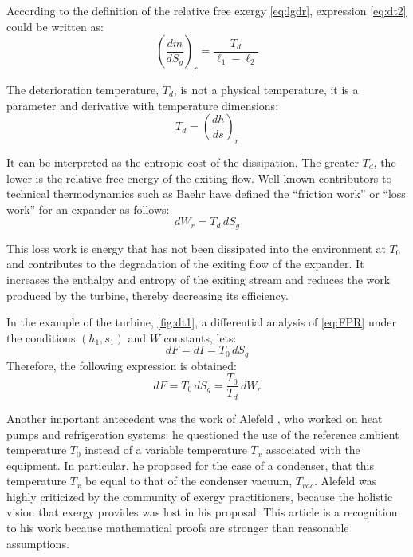 \documentclass[energies,article,submit,moreauthors,pdftex]{Definitions/mdpi}
\begin{document}
According to the definition of the relative free exergy \cref{eq:lgdr}, expression \eqref{eq:dt2} could be written as:
\begin{equation}
\left(\frac{dm}{dS_g}\right)_r = \frac{T_d}{\ell_1 - \ell_2}
\label{eq:dt2g}
\end{equation}

The deterioration temperature, $T_d$, is not a physical temperature, it is a parameter and derivative with temperature dimensions:
\begin{equation}
T_d=\left(\frac{dh}{ds}\right)_r
\end{equation}

It can be interpreted as the entropic cost of the dissipation. The greater $T_d$, the lower is the relative free energy of the exiting flow.
Well-known contributors to technical thermodynamics such as Baehr \cite{Baehr2005} have defined the “friction work” or “loss work” for an expander as follows:
\begin{equation}
	dW_r=T_d\,dS_g
\end{equation}

This loss work is energy that has not been dissipated into the environment at $T_0$ and contributes to the degradation of the exiting flow of the expander. It increases the enthalpy and entropy of the exiting stream and reduces the work produced by the turbine, thereby decreasing its efficiency.

In the example of the turbine, \cref{fig:dt1}, a differential analysis of \cref{eq:FPR} under the conditions $(h_1,s_1)$ and $W$ constants, lets:
\begin{equation}
dF=dI=T_0\,dS_g
\label{eq:dfi}
\end{equation}
Therefore, the following expression is obtained:
\begin{equation}
dF=T_0\,dS_g=\frac{T_0}{T_d}\,dW_r
\end{equation}

Another important antecedent was the work of Alefeld \cite{Alefeld1988}, who worked on heat pumps and refrigeration systems: he questioned the use of the reference ambient temperature $T_0$ instead of a variable temperature $T_x$ associated with the equipment. In particular, he proposed for the case of a condenser, that this temperature $T_x$ be equal to that of the condenser vacuum, $T_{vac}$. Alefeld was highly criticized by the community of exergy practitioners, because the holistic vision that exergy provides was lost in his proposal. This article is a recognition to his work because mathematical proofs are stronger than reasonable assumptions.
\end{document}

